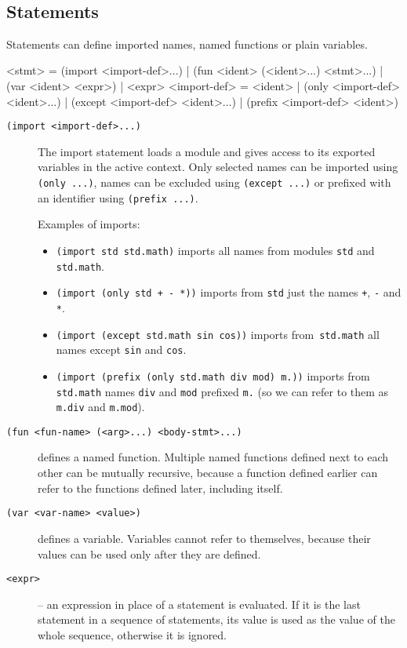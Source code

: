 ~
\subsection{Statements}

Statements can define imported names, named functions or plain variables.

\begin{ttcode}
<stmt>        = (import <import-def>...)
              | (fun <ident> (<ident>...) <stmt>...)
              | (var <ident> <expr>)
              | <expr>
<import-def>  = <ident>
              | (only <import-def> <ident>...)
              | (except <import-def> <ident>...)
              | (prefix <import-def> <ident>)
\end{ttcode}

\begin{description}

\item[\texttt{(import <import-def>...)}] The import statement loads a module and
  gives access to its exported variables in the active context. Only selected
  names can be imported using \texttt{(only ...)}, names can be excluded using
  \texttt{(except ...)} or prefixed with an identifier using \texttt{(prefix
  ...)}.

  Examples of imports:

  \begin{itemize}
    \item \texttt{(import std std.math)} imports all names from modules
      \texttt{std} and \texttt{std.math}.
    \item \texttt{(import (only std + - *))} imports from \texttt{std} just the
      names \texttt{+}, \texttt{-} and \texttt{*}.
    \item \texttt{(import (except std.math sin cos))} imports
      from~\texttt{std.math} all names except \texttt{sin} and \texttt{cos}.
    \item \texttt{(import (prefix (only std.math div mod) m.))} imports from
      \texttt{std.math} names \texttt{div} and \texttt{mod} prefixed
      \texttt{m.} (so we can refer to them as \texttt{m.div} and \texttt{m.mod}).
  \end{itemize}

\item[\texttt{(fun <fun-name> (<arg>...) <body-stmt>...)}] defines a named
  function. Multiple named functions defined next to each other can be mutually
  recursive, because a function defined earlier can refer to the functions
  defined later, including itself.

\item[\texttt{(var <var-name> <value>)}] defines a variable. Variables cannot
  refer to themselves, because their values can be used only after they are
  defined.

\item[\texttt{<expr>}] -- an expression in place of a statement is evaluated. If
  it is the last statement in a sequence of statements, its value is used as the
  value of the whole sequence, otherwise it is ignored.

\end{description}

